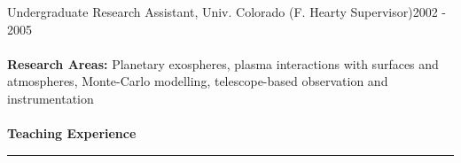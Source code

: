\documentclass[12pt]{report}
\begin{document}
\noindent Undergraduate Research Assistant, Univ. Colorado (F. Hearty Supervisor)\hfill 2002 - 2005\\
\vspace{1 mm}\\
\textbf{Research Areas:} Planetary exospheres, plasma interactions with surfaces and atmospheres, Monte-Carlo modelling, telescope-based observation and instrumentation\\
\vspace{2 mm}\\
\bf{Teaching Experience}\rm \hspace*{\fill} \\
\rule{\textwidth}{1pt}
\end{document}
